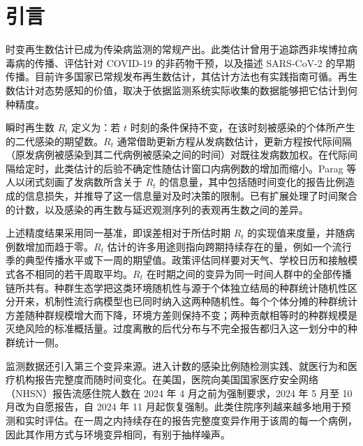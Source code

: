 \section{引言}
\label{sec:intro}

时变再生数估计已成为传染病监测的常规产出。此类估计曾用于追踪西非埃博拉病毒病的传播\citep{nouvellet2018simple}、评估针对 COVID-19 的非药物干预\citep{flaxman2020estimating}，以及描述 SARS-CoV-2 的早期传播\citep{kucharski2020early}。目前许多国家已常规发布再生数估计\citep{huisman2022estimation}，其估计方法也有实践指南可循\citep{gostic2020practical, steyn2025primer}。再生数估计对态势感知的价值，取决于依据监测系统实际收集的数据能够把它估计到何种精度。

瞬时再生数 $R_t$ 定义为：若 $t$ 时刻的条件保持不变，在该时刻被感染的个体所产生的二代感染的期望数\citep{fraser2007estimating}。$R_t$ 通常借助更新方程从发病数估计，更新方程按代际间隔（原发病例被感染到其二代病例被感染之间的时间）对既往发病数加权\citep{wallinga2004different, cori2013new, thompson2019improved}。在代际间隔给定时，此类估计的后验不确定性随估计窗口内病例数的增加而缩小\citep{cori2013new}。Parag 等人以闭式刻画了发病数所含关于 $R_t$ 的信息量，其中包括随时间变化的报告比例造成的信息损失，并推导了这一信息量对及时决策的限制\citep{parag2021improved, parag2022quantifying, parag2025asymmetric}。已有扩展处理了时间聚合的计数\citep{nash2023estimating, ogigittins2024simulation}，以及感染的再生数与延迟观测序列的表观再生数之间的差异\citep{eales2024differences}。

上述精度结果采用同一基准，即误差相对于所估时期 $R_t$ 的实现值来度量，并随病例数增加而趋于零。$R_t$ 估计的许多用途则指向跨期持续存在的量，例如一个流行季的典型传播水平或下一周的期望值。政策评估同样要对天气、学校日历和接触模式各不相同的若干周取平均\citep{dalziel2018urbanization}。$R_t$ 在时期之间的变异为同一时间人群中的全部传播链所共有。种群生态学把这类环境随机性与源于个体独立结局的种群统计随机性区分开来\citep{engen1998demographic, rohani2002determinism, lande2003stochastic}，机制性流行病模型也已同时纳入这两种随机性\citep{breto2009time}。每个个体分摊的种群统计方差随种群规模增大而下降，环境方差则保持不变；两种贡献相等时的种群规模是灭绝风险的标准概括量\citep{lande2003stochastic}。过度离散的后代分布\citep{lloydsmith2005superspreading, endo2020estimating}与不完全报告都归入这一划分中的种群统计一侧。

监测数据还引入第三个变异来源。进入计数的感染比例随检测实践、就医行为和医疗机构报告完整度而随时间变化\citep{azmon2014estimating, stoner2019hierarchical, parag2022fundamental}。在美国，医院向美国国家医疗安全网络（NHSN）报告流感住院人数在 2024 年 4 月之前为强制要求，2024 年 5 月至 10 月改为自愿报告，自 2024 年 11 月起恢复强制\citep{cdc2026nhsn}。此类住院序列越来越多地用于预测和实时评估\citep{mathis2024evaluation}。在一周之内持续存在的报告完整度变异作用于该周的每一个病例，因此其作用方式与环境变异相同，有别于抽样噪声。

